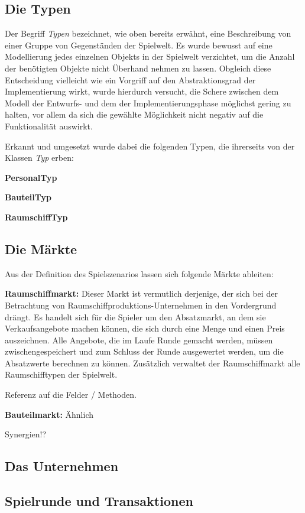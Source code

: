 \subsection{Die Typen}
Der Begriff \textit{Typen} bezeichnet, wie oben bereits erwähnt, eine Beschreibung von einer Gruppe von Gegenständen der Spielwelt. Es wurde bewusst auf eine Modellierung jedes einzelnen Objekts in der Spielwelt verzichtet, um die Anzahl der benötigten Objekte nicht Überhand nehmen zu lassen. Obgleich diese Entscheidung vielleicht wie ein Vorgriff auf den Abstraktionsgrad der Implementierung wirkt, wurde hierdurch versucht, die Schere zwischen dem Modell der Entwurfs- und dem der Implementierungsphase möglichst gering zu halten, vor allem da sich die gewählte Möglichkeit nicht negativ auf die Funktionalität auswirkt.

Erkannt und umgesetzt wurde dabei die folgenden Typen, die ihrerseits von der Klassen \textit{Typ} erben:
\begin{seList}
\item \textbf{PersonalTyp}
\item \textbf{BauteilTyp}
\item \textbf{RaumschiffTyp}
\end{seList}

\subsection{Die Märkte}
Aus der Definition des Spielszenarios lassen sich folgende Märkte ableiten:
\begin{seList}
\item \textbf{Raumschiffmarkt:} Dieser Markt ist vermutlich derjenige, der sich bei der Betrachtung von Raumschiffproduktions-Unternehmen in den Vordergrund drängt. Es handelt sich für die Spieler um den Absatzmarkt, an dem sie Verkaufsangebote machen können, die sich durch eine Menge und einen Preis auszeichnen. Alle Angebote, die im Laufe Runde gemacht werden, müssen zwischengespeichert und zum Schluss der Runde ausgewertet werden, um die Absatzwerte berechnen zu können. Zusätzlich verwaltet der Raumschiffmarkt alle Raumschifftypen der Spielwelt.

Referenz auf die Felder / Methoden.
\item \textbf{Bauteilmarkt:} Ähnlich
\end{seList}

Synergien!?

\subsection{Das Unternehmen}

\subsection{Spielrunde und Transaktionen}